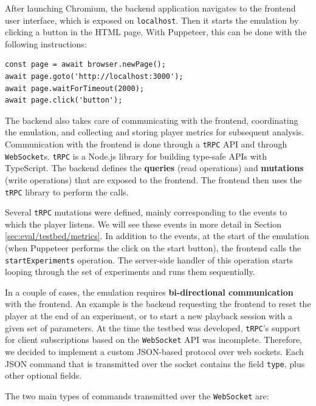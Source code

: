 After launching Chromium, the backend application navigates to the frontend user interface, which is exposed on \texttt{localhost}. Then it starts the emulation by clicking a button in the HTML page. With Puppeteer, this can be done with the following instructions:

\begin{verbatim}
const page = await browser.newPage();
await page.goto('http://localhost:3000');
await page.waitForTimeout(2000);
await page.click('button');
\end{verbatim}

The backend also takes care of communicating with the frontend, coordinating the emulation, and collecting and storing player metrics for subsequent analysis. Communication with the frontend is done through a \texttt{tRPC} API and through \texttt{WebSocket}s. \texttt{tRPC} is a Node.js library for building type-safe APIs with TypeScript. The backend defines the \textbf{queries} (read operations) and \textbf{mutations} (write operations) that are exposed to the frontend. The frontend then uses the \texttt{tRPC} library to perform the calls.

Several \texttt{tRPC} mutations were defined, mainly corresponding to the events to which the player listens. We will see these events in more detail in Section \ref{sec:eval/testbed/metrics}. In addition to the events, at the start of the emulation (when Puppeteer performs the click on the start button), the frontend calls the \texttt{startExperiments} operation. The server-side handler of this operation starts looping through the set of experiments and runs them sequentially.

In a couple of cases, the emulation requires \textbf{bi-directional communication} with the frontend. An example is the backend requesting the frontend to reset the player at the end of an experiment, or to start a new playback session with a given set of parameters. At the time the testbed was developed, \texttt{tRPC}'s support for client subscriptions based on the \texttt{WebSocket} API was incomplete. Therefore, we decided to implement a custom JSON-based protocol over web sockets. Each JSON command that is transmitted over the socket contains the field \texttt{type}, plus other optional fields.

The two main types of commands transmitted over the \texttt{WebSocket} are:

